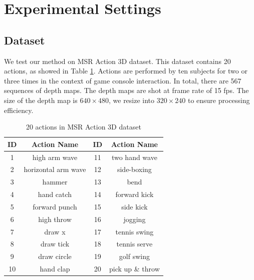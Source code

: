 \documentclass[review]{elsarticle}
\begin{document}

\section{Experimental Settings}

\subsection{Dataset}
We test our method on MSR Action 3D dataset. This dataset contains 20 actions, as showed in Table \ref{lbl:20actions}. Actions are performed by ten subjects for two or three times in the context of game console interaction. In total, there are 567 sequences of depth maps. The depth maps are shot at frame rate of 15 fps. The size of the depth map is $640 \times 480$, we resize into $320 \times 240$ to ensure processing efficiency.

\begin{table}[H]
	\begin{center}
		\begin{tabular}{c|c|c|c}
		
		  {\bf   ID  } & {\bf Action Name} &   {\bf   ID  } & {\bf Action Name} \\
		\hline
		             1 &  high arm wave &             11 &  two hand wave \\
		
		             2 & horizontal arm wave &             12 &    side-boxing \\
		
		             3 &         hammer &             13 &           bend \\
		
		             4 &     hand catch &             14 &   forward kick \\
		
		             5 &  forward punch &             15 &      side kick \\
		
		             6 &     high throw &             16 &        jogging \\
		
		             7 &         draw x &             17 &   tennis swing \\
		
		             8 &      draw tick &             18 &   tennis serve \\
		
		             9 &    draw circle &             19 &     golf swing \\
		
		            10 &      hand clap &             20 & pick up \& throw \\
		
		\end{tabular}
	\end{center}
	\caption{\label{lbl:20actions}20 actions in MSR Action 3D dataset}
\end{table}
\end{document}
